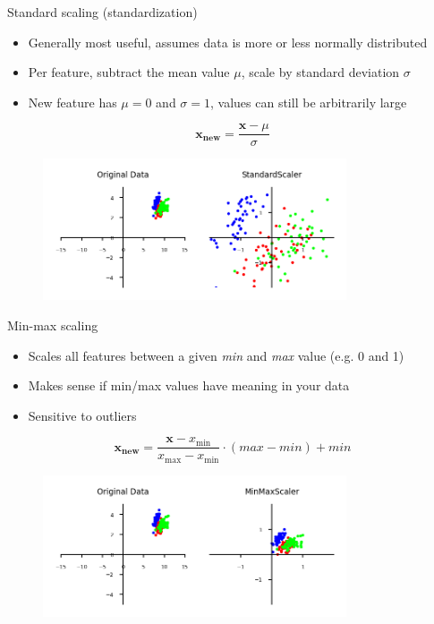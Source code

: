 \begin{frame}{Standard scaling (standardization)}
    \begin{itemize}
        \item Generally most useful, assumes data is more or less normally distributed
        \item Per feature, subtract the mean value $\mu$, scale by standard deviation $\sigma$
        \item New feature has $\mu = 0$ and $\sigma = 1$, values can still be arbitrarily large
    \end{itemize}

    \[
        \mathbf{x_{new}} = \frac{\mathbf{x} - \mu}{\sigma}
    \]

    \begin{figure}
        \centering
        \includegraphics[width=0.8\textwidth,keepaspectratio]{images/pre-processing/scaling_3.png}
    \end{figure}
\end{frame}


\begin{frame}{Min-max scaling}
    \begin{itemize}
        \item Scales all features between a given \textit{min} and \textit{max} value (e.g. 0 and 1)
        \item Makes sense if min/max values have meaning in your data
        \item Sensitive to outliers
    \end{itemize}

    \[
        \mathbf{x_{new}} = \frac{\mathbf{x} - x_{\text{min}}}{x_{\text{max}} - x_{\text{min}}} \cdot (max - min) + min
    \]

    \begin{figure}
        \centering
        \includegraphics[width=0.8\textwidth,keepaspectratio]{images/pre-processing/scaling_4.png}
    \end{figure}
\end{frame}



